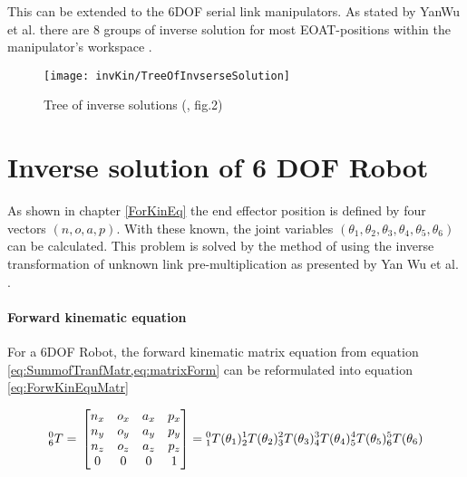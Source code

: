 This can be extended to the 6\ac{DOF} serial link manipulators.
As stated by YanWu et al. there are 8 groups of inverse solution for most \ac{EOAT}-positions within the manipulator's workspace \cite{invKinSolYanWu}. 

\begin{figure}[H]
	\texttt{[image: invKin/TreeOfInvserseSolution]}
	\caption{Tree of inverse solutions (\cite{invKinSolYanWu}, fig.2)}
	\label{fig:invKinTree}
\end{figure}

\section{Inverse solution of 6 \ac{DOF} Robot}

As shown in chapter \ref{ForKinEq} the end effector position is defined by four vectors $ (n,o,a,p) $. With these known, the joint variables $(\theta_1, \theta_2, \theta_3, \theta_4, \theta_5, \theta_6)$ can be calculated.
This problem  is solved by the method of using the inverse transformation of unknown link pre-multiplication as presented by Yan Wu et al. \cite{invKinSolYanWu}. 

\paragraph{Forward kinematic equation}
For a 6\ac{DOF} Robot, the  forward kinematic matrix equation from equation \cref{eq:SummofTranfMatr,eq:matrixForm} can be reformulated into equation \ref{eq:ForwKinEquMatr}

\begin{equation}\label{eq:ForwKinEquMatr}
	^0_6T = \\
	\begin{bmatrix}
n_x & o_x & a_x & p_x \\
n_y & o_y & a_y & p_y \\
n_z & o_z & a_z & p_z \\
0 & 0 & 0 & 1 \\
\end{bmatrix}
=
\phantom{}^0_1T(\theta_1)\phantom{}^1_2T(\theta_2)\phantom{}^2_3T(\theta_3)\phantom{}^3_4T(\theta_4)\phantom{}^4_5T(\theta_5)\phantom{}^5_6T(\theta_6)\\
\end{equation}

